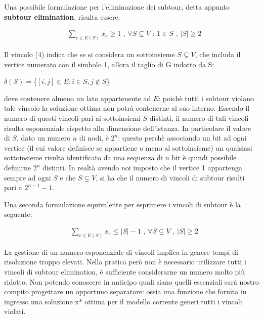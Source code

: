 \documentclass[11pt]{article}
\begin{document}
\vspace{2\baselineskip}

Una possibile formulazione per l'eliminazione dei subtour, detta appunto \textbf{subtour elimination}, risulta essere:

\begin{eqnarray}
&\displaystyle{\sum_{e \in E(S)}x_e \geq 1} \text{ , } \forall S \subsetneq V \text{ : } 1 \in S \text{ , } |S| \geq 2
\end{eqnarray}


Il vincolo (4) indica che se si considera un sottoinsieme $S \subsetneq V$, che includa il vertice numerato con il simbolo 1, allora il taglio di G indotto da S:

\begin{center}
$\delta(S) = $\{$ {[i,j]\in E : i \in S, j \notin S} $\} $ $
\end{center}

deve contenere almeno un lato appartenente ad $E$: poichè tutti i subtour violano tale vincolo la soluzione ottima non potrà contenerne al suo interno.  
Essendo il numero di questi vincoli pari ai sottoinsiemi $S$ distinti, il numero di tali vincoli risulta esponenziale rispetto alla dimensione dell'istanza. In particolare il valore di $S$, dato un numero $n$ di nodi, è $2^n$: questo perchè associando un bit ad ogni vertice (il cui valore definisce se appartiene o meno al sottoinsieme) un qualsiasi sottoinsieme risulta identificato da una sequenza di $n$ bit è quindi possibile definirne $2^n$ distinti. In realtà avendo noi imposto che il vertice 1 appartenga sempre ad ogni $S$ e che $S \subsetneq V$, si ha che il numero di vincoli di subtour risulti pari a  $2^{n-1} - 1$.

Una seconda formulazione equivalente per esprimere i vincoli di subtour è la seguente:

\begin{eqnarray}
&\displaystyle{\sum_{e \in E(S)}x_e \leq |S| - 1} \text{ , } \forall S \subsetneq V \text{ , } |S| \geq 2
\end{eqnarray}

La gestione di un numero esponenziale di vincoli implica in genere tempi di risoluzione troppo elevati. Nella pratica però non è necessario utilizzare tutti i vincoli di subtour elimination, è sufficiente considerarne un numero molto più ridotto. Non potendo conoscere in anticipo quali siano quelli essenziali sarà nostro compito progettare un opportuno separatore: ossia una funzione che fornita in ingresso una soluzione x* ottima per il modello corrente generi tutti i vincoli violati.
\end{document}
